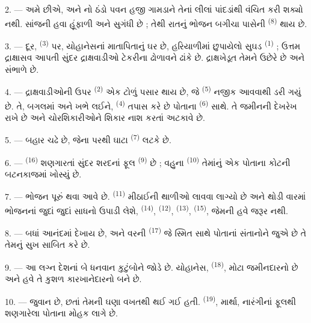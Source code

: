 2. --- અમે  છીએ, 
 અને નો ઠંડો પવન હજી ગામડાને તેનાં
લીલાં પાંદડાંથી વંચિત કરી શક્યો નથી. સાંજની હવા હૂંફાળી અને સુગંધી છે ;
તેથી રાતનું ભોજન બગીચા પાસેની  \textsuperscript{(8)}
થાય છે.

3. --- દૂર,  \textsuperscript{(3)} પર, યોહાનેસનાં
માતાપિતાનું ઘર છે, હરિયાળીમાં છુપાયેલો સુઘડ 
\textsuperscript{(1)} ; ઉત્તમ દ્રાક્ષાસવ આપતી સુંદર દ્રાક્ષવાડીઓ
ટેકરીના ઢોળાવને ઢાંકે છે. દ્રાક્ષખેડૂત તેમને ઉછેરે છે અને સંભાળે છે.

4. --- દ્રાક્ષવાડીઓની ઉપર  \textsuperscript{(2)} એક
ટોળું પસાર થાય છે, જે  \textsuperscript{(5)}
નજીક આવવાથી ડરી ગયું છે. તે, બગલમાં  અને ખભે
 લઈને,  \textsuperscript{(4)} તપાસ કરે
છે પોતાના  \textsuperscript{(6)} સાથે. તે જમીનની દેખરેખ
રાખે છે અને ચોરશિકારીઓને શિકાર નાશ કરતાં અટકાવે છે.

5. ---  બહાર  ચઢે છે, જેના પરથી
ઘાટા  \textsuperscript{(7)} લટકે છે.

6. ---  \textsuperscript{(16)} શણગારતાં સુંદર શરદનાં ફૂલ
 \textsuperscript{(9)} છે ; વહુના
 \textsuperscript{(10)} તેમાંનું એક પોતાના કોટની
બટનકાજમાં ખોસ્યું છે.

7. --- ભોજન પૂરું થવા આવે છે. 
\textsuperscript{(11)} મીઠાઈની થાળીઓ લાવવા લાગ્યો છે અને થોડી વારમાં
ભોજનનાં જુદાં જુદાં સાધનો ઉપાડી લેશે, 
\textsuperscript{(14)},  \textsuperscript{(12)},
 \textsuperscript{(13)}, 
\textsuperscript{(15)}, જેમની હવે જરૂર નથી.

\VUsaut{3.0mm}

8. --- બધાં આનંદમાં દેખાય છે, અને વરની 
\textsuperscript{(17)} જે સ્મિત સાથે પોતાનાં સંતાનોને જુએ છે તે તેમનું
સુખ સાબિત કરે છે.

9. --- આ લગ્ન દેશનાં બે ધનવાન કુટુંબોને જોડે છે. યોહાનેસ,
 \textsuperscript{(18)}, મોટા જમીનદારનો  છે
અને હવે તે કુશળ કારખાનેદારનો  બને છે.

10. ---  જુવાન છે, છતાં તેમની  ઘણા વખતથી
થઈ ગઈ હતી.  \textsuperscript{(19)}, માર્થા,
નારંગીનાં ફૂલથી શણગારેલા પોતાના  મોહક લાગે છે.

